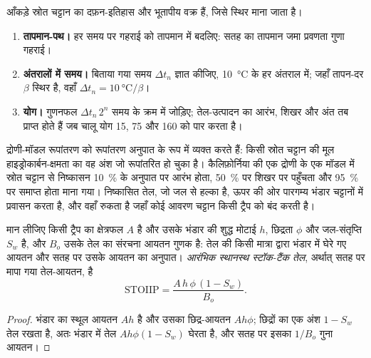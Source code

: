 \begin{method}\label{met:b2:energy-geology:tti}
आँकड़े स्रोत चट्टान का दफ़न-इतिहास और भूतापीय वक्र हैं, जिसे स्थिर माना जाता है।
\begin{enumerate}
  \item \textbf{तापमान-पथ।} हर समय पर गहराई को तापमान में बदलिए: सतह का तापमान
        जमा प्रवणता गुणा गहराई।
  \item \textbf{अंतरालों में समय।} बिताया गया समय $\Delta t_n$ ज्ञात कीजिए, \qty{10}{\celsius} के
        हर अंतराल में; जहाँ तापन-दर $\beta$ स्थिर है, वहाँ $\Delta t_n = \qty{10}{\celsius}/\beta$।
  \item \textbf{योग।} गुणनफल $\Delta t_n\,2^n$ समय के क्रम में जोड़िए; तेल-उत्पादन का आरंभ, शिखर और
        अंत तब प्राप्त होते हैं जब चालू योग 15, 75 और 160 को पार करता है।
\end{enumerate}
\end{method}

द्रोणी-मॉडल रूपांतरण को रूपांतरण अनुपात के रूप में व्यक्त करते हैं: किसी स्रोत चट्टान की मूल हाइड्रोकार्बन-क्षमता
का वह अंश जो रूपांतरित हो चुका है। कैलिफ़ोर्निया की एक द्रोणी के एक मॉडल में स्रोत चट्टान से निष्कासन
\qty{10}{\percent} के अनुपात पर आरंभ होता, \qty{50}{\percent} पर शिखर पर पहुँचता और \qty{95}{\percent} पर
समाप्त होता माना गया। निष्कासित तेल, जो जल से हल्का है, ऊपर की ओर पारगम्य भंडार चट्टानों में प्रवासन करता है,
और वहाँ रुकता है जहाँ कोई आवरण चट्टान किसी ट्रैप को बंद करती है।

\begin{proposition}[स्थानस्थ तेल]\label{prop:b2:energy-geology:volumetrics}
मान लीजिए किसी ट्रैप का क्षेत्रफल $A$ है और उसके भंडार की शुद्ध मोटाई $h$, छिद्रता $\phi$ और जल-संतृप्ति
$S_w$ है, और $B_o$ उसके तेल का संरचना आयतन गुणक है: तेल की किसी मात्रा द्वारा भंडार में घेरे गए आयतन
और सतह पर उसके आयतन का अनुपात। \emph{आरंभिक स्थानस्थ स्टॉक-टैंक
तेल}, अर्थात् सतह पर मापा गया तेल-आयतन, है
\begin{equation}
\mathrm{STOIIP} = \frac{A\,h\,\phi\,(1 - S_w)}{B_o} .
\label{eq:b2:energy-geology:stoiip}
\end{equation}
\end{proposition}

\begin{proof}
भंडार का स्थूल आयतन $Ah$ है और उसका छिद्र-आयतन $Ah\phi$; छिद्रों का एक अंश $1 - S_w$ तेल रखता है,
अतः भंडार में तेल $Ah\phi(1 - S_w)$ घेरता है, और सतह पर इसका $1/B_o$ गुना
आयतन।
\end{proof}

